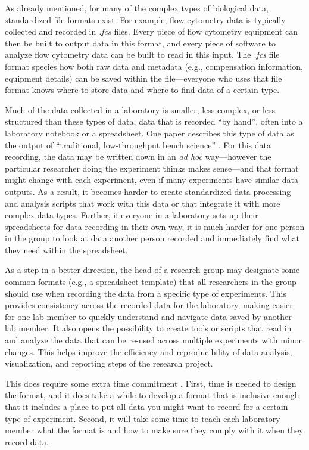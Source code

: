 \documentclass[]{tufte-book}
\begin{document}
As already mentioned, for many of the complex types of biological data,
standardized file formats exist. For example, flow cytometry data is typically
collected and recorded in \emph{.fcs} files. Every piece of flow cytometry equipment
can then be built to output data in this format, and every piece of software to
analyze flow cytometry data can be built to read in this input. The \emph{.fcs} file
format species how both raw data and metadata (e.g., compensation information,
equipment details) can be saved within the file---everyone who uses that file
format knows where to store data and where to find data of a certain type.

Much of the data collected in a laboratory is smaller, less complex, or less
structured than these types of data, data that is recorded ``by hand'', often into
a laboratory notebook or a spreadsheet. One paper describes this type of data as
the output of ``traditional, low-throughput bench science'' \citep{wilkinson2016fair}.
For this data recording, the data may be written down in an \emph{ad hoc}
way---however the particular researcher doing the experiment thinks makes
sense---and that format might change with each experiment, even if many
experiments have similar data outputs. As a result, it becomes harder to create
standardized data processing and analysis scripts that work with this data or
that integrate it with more complex data types. Further, if everyone in a
laboratory sets up their spreadsheets for data recording in their own way, it is
much harder for one person in the group to look at data another person recorded
and immediately find what they need within the spreadsheet.

As a step in a better direction, the head of a research group may
designate some common formats (e.g., a spreadsheet template) that all
researchers in the group should use when recording the data from a specific type
of experiments. This provides consistency across the recorded data for the
laboratory, making easier for one lab member to quickly understand and navigate
data saved by another lab member. It also opens the possibility to create tools
or scripts that read in and analyze the data that can be re-used across multiple
experiments with minor changes. This helps improve the efficiency and
reproducibility of data analysis, visualization, and reporting steps of the
research project.

This does require some extra time commitment \citep{brazma2006standards}. First, time
is needed to design the format, and it does take a while to develop a format
that is inclusive enough that it includes a place to put all data you might want
to record for a certain type of experiment. Second, it will take some time to
teach each laboratory member what the format is and how to make sure they comply
with it when they record data.
\end{document}
